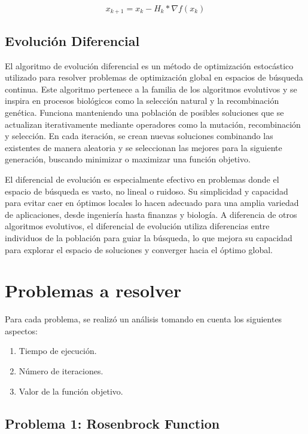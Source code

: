 \documentclass{article}
\begin{document}
$$x_{k+1} = x_{k} - H_{k} * \nabla f(x_{k})$$



\subsection{Evolución Diferencial}

El algoritmo de evolución diferencial es un método de optimización estocástico utilizado para resolver problemas de optimización global en espacios de búsqueda continua. Este algoritmo pertenece a la familia de los algoritmos evolutivos y se inspira en procesos biológicos como la selección natural y la recombinación genética. Funciona manteniendo una población de posibles soluciones que se actualizan iterativamente mediante operadores como la mutación, recombinación y selección. En cada iteración, se crean nuevas soluciones combinando las existentes de manera aleatoria y se seleccionan las mejores para la siguiente generación, buscando minimizar o maximizar una función objetivo.

El diferencial de evolución es especialmente efectivo en problemas donde el espacio de búsqueda es vasto, no lineal o ruidoso. Su simplicidad y capacidad para evitar caer en óptimos locales lo hacen adecuado para una amplia variedad de aplicaciones, desde ingeniería hasta finanzas y biología. A diferencia de otros algoritmos evolutivos, el diferencial de evolución utiliza diferencias entre individuos de la población para guiar la búsqueda, lo que mejora su capacidad para explorar el espacio de soluciones y converger hacia el óptimo global.


\section{Problemas a resolver}

Para cada problema, se realizó un análisis tomando en cuenta los siguientes aspectos:

\begin{enumerate}
	\item Tiempo de ejecución.
	\item Número de iteraciones.
	\item Valor de la función objetivo.
\end{enumerate}

\subsection{Problema 1: Rosenbrock Function}
\end{document}
